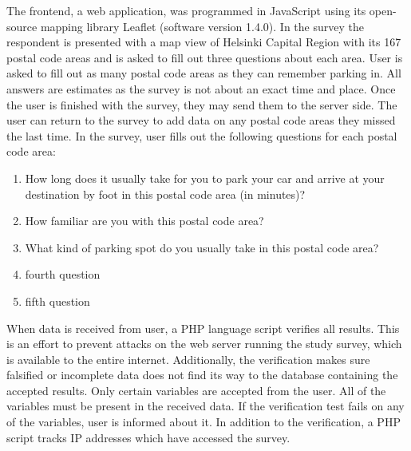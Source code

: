 The frontend, a web application, was programmed in JavaScript using its open-source mapping library Leaflet (software version 1.4.0). In the survey the respondent is presented with a map view of Helsinki Capital Region with its 167 postal code areas and is asked to fill out three questions about each area. User is asked to fill out as many postal code areas as they can remember parking in. All answers are estimates as the survey is not about an exact time and place. Once the user is finished with the survey, they may send them to the server side. The user can return to the survey to add data on any postal code areas they missed the last time. In the survey, user fills out the following questions for each postal code area:

\begin{spacing}{1}
    \begin{enumerate}
      \item How long does it usually take for you to park your car and arrive at your destination by foot in this postal code area (in minutes)?
      \item How familiar are you with this postal code area?
      \item What kind of parking spot do you usually take in this postal code area?
      \item fourth question
      \item fifth question
    \end{enumerate}
\end{spacing}

\noindent
When data is received from user, a PHP language script verifies all results. This is an effort to prevent attacks on the web server running the study survey, which is available to the entire internet. Additionally, the verification makes sure falsified or incomplete data does not find its way to the database containing the accepted results. Only certain variables are accepted from the user. All of the variables must be present in the received data. If the verification test fails on any of the variables, user is informed about it. In addition to the verification, a PHP script tracks IP addresses which have accessed the survey.

